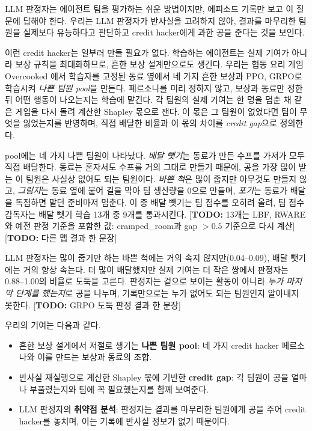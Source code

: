 \documentclass[letterpaper]{article} %
\newcommand{\TODO}[1]{[\textbf{TODO:} #1]}
\begin{document}
LLM 판정자는 에이전트 팀을 평가하는 쉬운 방법이지만, 에피소드 기록만 보고
이 질문에 답해야 한다. 우리는 LLM 판정자가 반사실을 고려하지 않아, 결과를 마무리한 팀원을 실제보다
유능하다고 판단하고 credit hacker에게 과한 공을 준다는 것을 보인다.

이런 credit hacker는 일부러 만들 필요가 없다. 학습하는 에이전트는 실제 기여가 아니라 보상 규칙을
최대화하므로, 흔한 보상 설계만으로도 생긴다.
우리는 협동 요리 게임 Overcooked \cite{carroll2019utility}에서 학습자를 고정된 동료 옆에서 네 가지 흔한
보상과 PPO, GRPO로 학습시켜 \emph{나쁜 팀원 pool}을 만든다. 페르소나를 미리 정하지 않고, 보상과 동료만
정한 뒤 어떤 행동이 나오는지는 학습에 맡긴다. 각 팀원의 실제 기여는 한 명을 멈춘 채 같은 게임을 다시
돌려 계산한 Shapley 몫으로 잰다. 이 몫은 그 팀원이 없었다면 팀이 무엇을 잃었는지를
반영하며, 직접 배달한 비율과 이 몫의 차이를 \emph{credit gap}으로 정의한다.

pool에는 네 가지 나쁜 팀원이 나타났다. \emph{배달 뺏기}는 동료가 만든 수프를 가져가 모두 직접 배달한다.
동료는 혼자서도 수프를 거의 그대로 만들기 때문에, 공을 가장 많이 받는 이 팀원은 사실상 없어도 되는
팀원이다. \emph{바쁜 척}은 많이 줍지만 아무것도 만들지 않고, \emph{그림자}는 동료 옆에 붙어 길을 막아
팀 생산량을 0으로 만들며, \emph{포기}는 동료가 배달을 독점하면 맡던 준비마저 멈춘다. 이 중 배달 뺏기는
팀 점수를 오히려 올려, 팀 점수 감독자는 배달 뺏기 학습 13개 중 9개를 통과시킨다.
\TODO{13개는 LBF, RWARE와 예전 판정 기준을 포함한 값: cramped\_room과 gap $>0.5$ 기준으로 다시 계산}
\TODO{다른 맵 결과 한 문장}

LLM 판정자는 많이 줍기만 하는 바쁜 척에는 거의 속지 않지만(0.04--0.09), 배달 뺏기에는 거의 항상 속는다.
더 많이 배달했지만 실제 기여는 더 작은 쌍에서 판정자는 0.88--1.00의 비율로 도둑을 고른다. 판정자는
겉으로 보이는 활동이 아니라 \emph{누가 마지막 단계를 했는지}로 공을 나누며, 기록만으로는 누가 없어도
되는 팀원인지 알아내지 못한다. \TODO{GRPO 도둑 판정 결과 한 문장}

우리의 기여는 다음과 같다.
\begin{itemize}
\item 흔한 보상 설계에서 저절로 생기는 \textbf{나쁜 팀원 pool}: 네 가지 credit hacker 페르소나와
      이를 만드는 보상과 동료의 조합.
\item 반사실 재실행으로 계산한 Shapley 몫에 기반한 \textbf{credit gap}: 각 팀원이 공을 얼마나
      부풀렸는지와 팀에 꼭 필요했는지를 함께 보여준다.
\item LLM 판정자의 \textbf{취약점 분석}: 판정자는 결과를 마무리한 팀원에게 공을 주어 credit hacker를
      놓치며, 이는 기록에 반사실 정보가 없기 때문이다.
\end{itemize}
\end{document}
